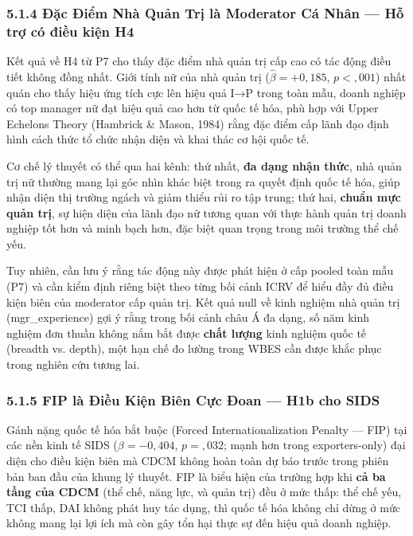 \documentclass[12pt,a4paper]{article}
\begin{document}
\hypertarget{514-ux111ux1eb7c-ux111iux1ec3m-nhuxe0-quux1ea3n-trux1ecb-luxe0-moderator-cuxe1-nhuxe2n--hux1ed7-trux1ee3-cuxf3-ux111iux1ec1u-kiux1ec7n-h4}{%
\subsubsection{5.1.4 Đặc Điểm Nhà Quản Trị là Moderator Cá Nhân --- Hỗ
trợ có điều kiện
H4}\label{514-ux111ux1eb7c-ux111iux1ec3m-nhuxe0-quux1ea3n-trux1ecb-luxe0-moderator-cuxe1-nhuxe2n--hux1ed7-trux1ee3-cuxf3-ux111iux1ec1u-kiux1ec7n-h4}}

Kết quả về H4 từ P7 cho thấy đặc điểm nhà quản trị cấp cao có tác động
điều tiết không đồng nhất. Giới tính nữ của nhà quản trị
(\(\hat{\beta} = +0{,}185\), \(p < {,}001\)) nhất quán cho thấy hiệu ứng
tích cực lên hiệu quả I→P trong toàn mẫu, doanh nghiệp có top manager nữ
đạt hiệu quả cao hơn từ quốc tế hóa, phù hợp với Upper Echelons Theory
(Hambrick \& Mason, 1984) rằng đặc điểm cấp lãnh đạo định hình cách thức
tổ chức nhận diện và khai thác cơ hội quốc tế.

Cơ chế lý thuyết có thể qua hai kênh: thứ nhất, \textbf{đa dạng nhận
thức}, nhà quản trị nữ thường mang lại góc nhìn khác biệt trong ra quyết
định quốc tế hóa, giúp nhận diện thị trường ngách và giảm thiểu rủi ro
tập trung; thứ hai, \textbf{chuẩn mực quản trị}, sự hiện diện của lãnh
đạo nữ tương quan với thực hành quản trị doanh nghiệp tốt hơn và minh
bạch hơn, đặc biệt quan trọng trong môi trường thể chế yếu.

Tuy nhiên, cần lưu ý rằng tác động này được phát hiện ở cấp pooled toàn
mẫu (P7) và cần kiểm định riêng biệt theo từng bối cảnh ICRV để hiểu đầy
đủ điều kiện biên của moderator cấp quản trị. Kết quả null về kinh
nghiệm nhà quản trị (mgr\_experience) gợi ý rằng trong bối cảnh châu Á
đa dạng, số năm kinh nghiệm đơn thuần không nắm bắt được \textbf{chất
lượng} kinh nghiệm quốc tế (breadth vs. depth), một hạn chế đo lường
trong WBES cần được khắc phục trong nghiên cứu tương lai.

\hypertarget{515-fip-luxe0-ux111iux1ec1u-kiux1ec7n-biuxean-cux1ef1c-ux111oan--h1b-cho-sids}{%
\subsubsection{5.1.5 FIP là Điều Kiện Biên Cực Đoan --- H1b cho
SIDS}\label{515-fip-luxe0-ux111iux1ec1u-kiux1ec7n-biuxean-cux1ef1c-ux111oan--h1b-cho-sids}}

Gánh nặng quốc tế hóa bắt buộc (Forced Internationalization Penalty ---
FIP) tại các nền kinh tế SIDS (\(\beta = -0{,}404\), \(p = {,}032\);
mạnh hơn trong exporters-only) đại diện cho điều kiện biên mà CDCM không
hoàn toàn dự báo trước trong phiên bản ban đầu của khung lý thuyết. FIP
là biểu hiện của trường hợp khi \textbf{cả ba tầng của CDCM} (thể chế,
năng lực, và quản trị) đều ở mức thấp: thể chế yếu, TCI thấp, DAI không
phát huy tác dụng, thì quốc tế hóa không chỉ dừng ở mức không mang lại
lợi ích mà còn gây tổn hại thực sự đến hiệu quả doanh nghiệp.
\end{document}
